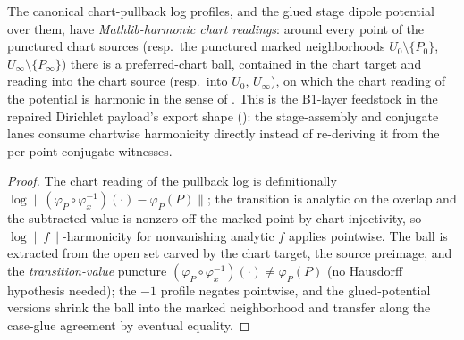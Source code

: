 \begin{lemma}
\label{lem:stage-log-profile-chartwise-harmonic-readings}
The canonical chart-pullback log profiles, and the glued stage dipole
potential over them, have \emph{Mathlib-harmonic chart readings}: around
every point of the punctured chart sources (resp.\ the punctured marked
neighborhoods \(U_0 \setminus \{P_0\}\), \(U_\infty \setminus
\{P_\infty\}\)) there is a preferred-chart ball, contained in the chart
target and reading into the chart source (resp.\ into \(U_0\),
\(U_\infty\)), on which the chart reading of the potential is harmonic in
the sense of .  This is the
B1-layer feedstock in the repaired Dirichlet payload's export shape
(): the stage-assembly and conjugate lanes
consume chartwise harmonicity directly instead of re-deriving it from
the per-point conjugate witnesses.
\leanok
\end{lemma}
\begin{proof}\leanok
The chart reading of the pullback log is definitionally
\(\log\lVert(\varphi_P \circ \varphi_x^{-1})(\cdot) -
\varphi_P(P)\rVert\); the transition is analytic on the overlap and the
subtracted value is nonzero off the marked point by chart injectivity,
so \(\log\lVert f\rVert\)-harmonicity for nonvanishing analytic \(f\)
applies pointwise.  The ball is extracted from the open set carved by
the chart target, the source preimage, and the \emph{transition-value}
puncture \((\varphi_P \circ \varphi_x^{-1})(\cdot) \ne \varphi_P(P)\)
(no Hausdorff hypothesis needed); the \(-1\) profile negates pointwise,
and the glued-potential versions shrink the ball into the marked
neighborhood and transfer along the case-glue agreement by eventual
equality.
\end{proof}

